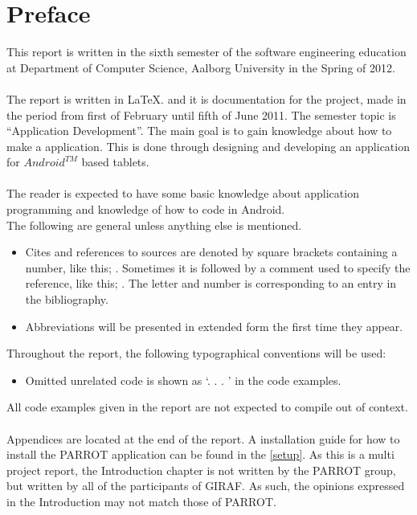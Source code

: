 \chapter*{Preface}
This report is written in the sixth semester of the software engineering education at Department of Computer Science, Aalborg University in the Spring of 2012.  \\
\\
The report is written in \LaTeX. and it is documentation for the project, made in the period from first of February until fifth of June 2011.
The semester topic is ``Application Development''. The main goal is to gain knowledge about how to make a application. This is done through designing and developing an application for $Android^{TM}$ based tablets.\\
\\
The reader is expected to have some basic knowledge about application programming and knowledge of how to code in Android. \\
The following are general unless anything else is mentioned.

\begin{itemize}
\item Cites and references to sources are denoted by square brackets containing a number,  like this; \cite{XP}. Sometimes it is followed by a comment used to specify the reference, like this; \cite[Comment]{XP}. The letter and number is corresponding to an entry in the bibliography. 
\item Abbreviations will be presented in extended form the first time they appear. 
\end{itemize}

Throughout the report, the following typographical conventions will be used:
 
\begin{itemize}
\item Omitted unrelated code is shown as `. . . ’ in the code examples.
\end{itemize}

All code examples given in the report are not expected to compile out of context.\\
\\
Appendices are located at the end of the report.\newline
A installation guide for how to install the PARROT application can be found in the \autoref{setup}.
As this is a multi project report, the Introduction chapter is not written by the PARROT group, but written by all of the participants of GIRAF. As such, the opinions expressed in the Introduction may not match those of PARROT.\\ \\ 

